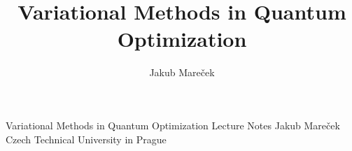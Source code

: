 \documentclass[a4paper,10pt,reqno]{amsbook}
\title{Variational Methods in Quantum Optimization}
\author{Jakub Mare{\v c}ek}
\institute{CTU}
\def\biblio{}
\numberwithin{equation}{\numberbychaporsect}
\numberwithin{figure}{\numberbychaporsect}
\numberwithin{table}{\numberbychaporsect}
\begin{document}
\def\biblio{}

\vfill
\LARGE{Variational Methods in Quantum Optimization}
\vskip 1cm
\Large{Lecture Notes}
\vskip 5cm
\Large{Jakub Mare{\v c}ek}
\vskip 1cm
\normalsize{Czech Technical University in Prague}

\tableofcontents















\providecommand{\bbletal}{et al.}

\clearpage


\end{document}
